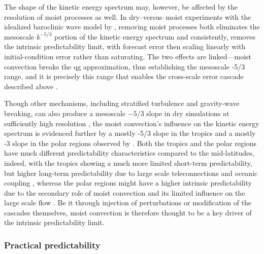 The shape of the kinetic energy spectrum may, however, be affected by
the resolution of moist processes as well. In dry--versus--moist
experiments with the idealized baroclinic wave model by
\textcite{zhangMesoscalePredictabilityMoist2007}, removing moist processes both
eliminates the mesoscale $k^{-5/3}$ portion of the kinetic energy spectrum and
consistently, removes the intrinsic predictability limit, with forecast error
then scaling linearly with initial-condition error rather than saturating.
The two effects are linked---moist convection breaks the \gls{qg}
approximation, thus establishing the mesoscale -5/3 range, and it is
precisely this range that enables the cross-scale error cascade described above
\parencite{sunIntrinsicPracticalLimits2016}.

Though other mechanisms, including
stratified turbulence and gravity-wave breaking, can also produce a mesoscale
$-5/3$ slope in dry simulations at sufficiently high resolution
\parencite{waiteMesoscaleKineticEnergy2009,
    skamarockAtmosphericKineticEnergy2014}, the moist convection's influence on the
kinetic energy spectrum is evidenced further by a mostly -5/3 slope in the
tropics and a mostly -3 slope in the polar regions observed by
\textcite{judtAtmosphericPredictabilityTropics2020}. Both the tropics and the
polar regions have much different predictability characteristics compared to
the mid-latitudes, indeed, with the tropics showing a much more limited
short-term predictability, but higher long-term predictability due to large
scale teleconnections and oceanic coupling
\parencite{diasEquatorialWavesSkill2018}, whereas the polar regions
might have a higher intrinsic predictability due to the secondary role of
moist convection and its limited influence on the large scale flow
\parencite{lloverasExploringIntrinsicPredictability2025}. Be it through
injection of perturbations or modification of the cascades themselves,
moist convection is therefore thought to be a key driver of the intrinsic
predictability limit.

\subsubsection{Practical predictability}

